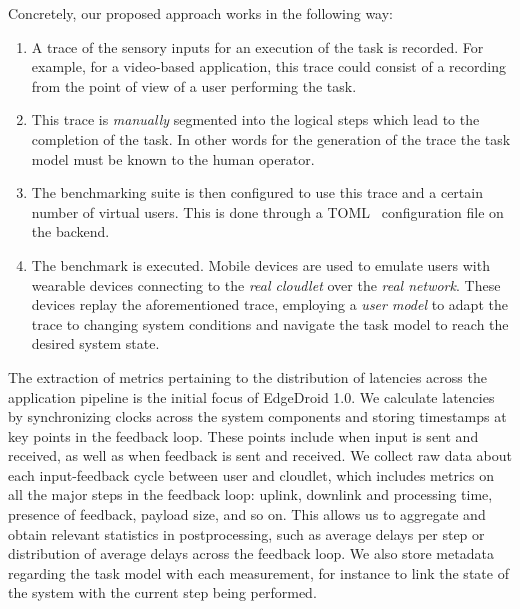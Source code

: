 Concretely, our proposed approach works in the following way:
\begin{enumerate}
    \item A trace of the sensory inputs for an execution of the task is recorded.
          For example, for a video-based application, this trace could consist of a recording from the point of view of a user performing the task.
    \item This trace is \emph{manually} segmented into the logical steps which lead to the completion of the task.
          In other words for the generation of the trace the task model must be known to the human operator.
    \item The benchmarking suite is then configured to use this trace and a certain number of virtual users.
          This is done through a TOML~\cite{toml} configuration file on the backend.
    \item The benchmark is executed.
          Mobile devices are used to emulate users with wearable devices connecting to the \emph{real cloudlet} over the \emph{real network}.
          These devices replay the aforementioned trace, employing a \emph{user model} to adapt the trace to changing system conditions and navigate the task model to reach the desired system state.
\end{enumerate}

The extraction of metrics pertaining to the distribution of latencies across the application pipeline is the initial focus of EdgeDroid 1.0.
We calculate latencies by synchronizing clocks across the system components and storing timestamps at key points in the feedback loop.
These points include when input is sent and received, as well as when feedback is sent and received.
We collect raw data about each input-feedback cycle between user and cloudlet, which includes metrics on all the major steps in the feedback loop: uplink, downlink and processing time, presence of feedback, payload size, and so on.
This allows us to aggregate and obtain relevant statistics in postprocessing, such as average delays per step or distribution of average delays across the feedback loop.
We also store metadata regarding the task model with each measurement, for instance to link the state of the system with the current step being performed.


